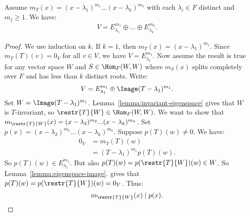     \begin{theorem}
        Assume $m_T(x) = (x-\lambda_1)^{m_1}...(x-\lambda_k)^{m_k}$ with each $\lambda_i \in F$ distinct and $m_j \geq 1$. We have:
            \begin{equation*}
            \begin{split}
                V = E_{\lambda_1}^{m_1} \oplus ... \oplus E_{\lambda_k}^{m_k}.
            \end{split}
            \end{equation*}
    \end{theorem}
        \begin{proof}
            We use induction on $k$. If $k=1$, then $m_T(x) = (x-\lambda_1)^{m_1}$. Since $m_T(T)(v) = 0_V$ for all $v \in V$, we have $V = E_{\lambda_1}^{m_1}$. Now assume the result is true for any vector space $W$ and $S \in \Hom_F(W,W)$ where $m_S(x)$ splits completely over $F$ and has less than $k$ distinct roots. Write:
                \begin{equation*}
                \begin{split}
                    V = E_{\lambda_1}^{m_1} \oplus \Image(T-\lambda_1)^{m_1}.
                \end{split}
                \end{equation*}
            Set $W = \Image(T-\lambda_1)^{m_1}$. Lemma~\ref{lemma:invariant-eigenspace} gives that $W$ is $T$-invariant, so $\restr{T}{W} \in \Hom_F(W,W)$. We want to show that $m_\restr{T}{W}(x) = (x - \lambda_2)^{m_2}...(x-\lambda_k)^{m_k}$. Set $p(x) = (x - \lambda_2)^{m_2}...(x-\lambda_k)^{m_k}$. Suppose $p(T)(w) \neq 0$. We have:
                \begin{equation*}
                \begin{split}
                    0_V
                    & = m_T(T)(w) \\
                    & = (T-\lambda_1)^{m_1}p(T)(w).
                \end{split}
                \end{equation*}
            So $p(T)(w) \in E_{\lambda_1}^{m_1}$. But also $p(T)(w) = p(\restr{T}{W})(w) \in W$. So Lemma~\ref{lemma:eigenspace-image}. gives that $p(T)(w) = p(\restr{T}{W})(w) = 0_V$. Thus:
                \begin{equation*}
                \begin{split}
                    m_\restr{T}{W}(x) \mid p(x).
                \end{split}
                \end{equation*}

\end{proof}
